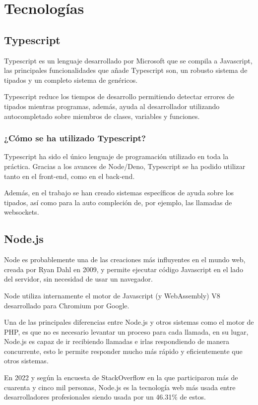 \section{Tecnologías}


\subsection{Typescript}
Typescript es un lenguaje desarrollado por Microsoft que se compila a Javascript, las principales funcionalidades que añade Typescript son, un robusto sistema de tipados y un completo sistema de genéricos.

Typescript reduce los tiempos de desarrollo permitiendo detectar errores de tipados mientras programas, además, ayuda al desarrollador utilizando autocompletado sobre miembros de clases, variables y funciones.

\subsubsection{¿Cómo se ha utilizado Typescript?}
Typescript ha sido el único lenguaje de programación utilizado en toda la práctica. Gracias a los avances de Node/Deno, Typescript se ha podido utilizar tanto en el front-end, como en el back-end.

Además, en el trabajo se han creado sistemas específicos de ayuda sobre los tipados, así como para la auto compleción de, por ejemplo, las llamadas de websockets.


\subsection{Node.js}
Node es probablemente una de las creaciones más influyentes en el mundo web, creada por Ryan Dahl en 2009, y permite ejecutar código Javascript en el lado del servidor, sin necesidad de usar un navegador.

Node utiliza internamente el motor de Javascript (y WebAssembly) V8 desarrollado para Chromium por Google.

Una de las principales diferencias entre Node.js y otros sistemas como el motor de PHP, es que no es necesario levantar un proceso para cada llamada, en su lugar, Node.js es capaz de ir recibiendo llamadas e irlas respondiendo de manera concurrente, esto le permite responder mucho más rápido y eficientemente que otros sistemas.

En 2022 y según la encuesta de StackOverflow en la que participaron más de cuarenta y cinco mil personas, Node.js es la tecnología web más usada entre desarrolladores profesionales siendo usada por un 46.31\% de estos.

